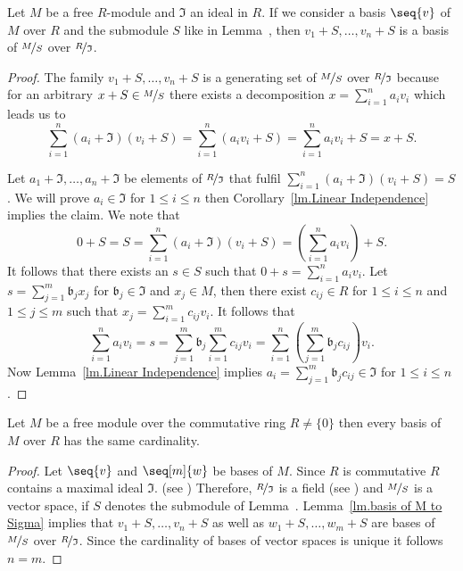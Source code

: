 \begin{lemma}\label{lm.basis of M to Sigma}
Let $M$ be a free $R$-module and $\mathfrak{I}$ an ideal in $R$. If we consider a basis $\seq{v}$ of $M$ over $R$ and the submodule $S$ like in Lemma~, then $v_1+S,\ldots,v_n+S$ is a basis of $\nicefrac{M}{S}$ over $\nicefrac{R}{\mathfrak{I}}$.
\end{lemma}
\begin{proof}
The family $v_1+S,\ldots,v_n+S$ is a generating set of $\nicefrac{M}{S}$ over $\nicefrac{R}{\mathfrak{I}}$ because for an arbitrary $x+S\in\nicefrac{M}{S}$ there exists a decomposition $x=\sum_{i=1}^na_iv_i$ which leads us to 
\begin{equation*}
\sum_{i=1}^n(a_i+\mathfrak{I})(v_i+S)=\sum_{i=1}^n(a_iv_i+S)=\sum_{i=1}^na_iv_i+S=x+S.
\end{equation*}

Let $a_1+\mathfrak{I},\ldots,a_n+\mathfrak{I}$ be elements of $\nicefrac{R}{\mathfrak{I}}$ that fulfil $\sum_{i=1}^n(a_i+\mathfrak{I})(v_i+S)=S$. We will prove $a_i\in\mathfrak{I}$ for $1\leq i\leq n$ then Corollary~\ref{lm.Linear Independence} implies the claim. We note that 
\begin{equation*}
0+S=S=\sum_{i=1}^n(a_i+\mathfrak{I})(v_i+S)=\left(\sum_{i=1}^n a_iv_i\right)+S.
\end{equation*}
It follows that there exists an $s\in S$ such that $0+s=\sum_{i=1}^n a_iv_i$. Let $s=\sum_{j=1}^m\mathfrak{b}_jx_j$ for $\mathfrak{b}_j\in \mathfrak{I}$ and $x_j\in M$, then there exist $c_{ij}\in R$ for $1\leq i\leq n$ and $1\leq j\leq m$ such that $x_j=\sum_{i=1}^mc_{ij}v_i$. It follows that
\begin{equation*}
\sum_{i=1}^n a_iv_i=s=\sum_{j=1}^m\mathfrak{b}_j\sum_{i=1}^mc_{ij}v_i=\sum_{i=1}^n\left(\sum_{j=1}^m\mathfrak{b}_jc_{ij}\right)v_i.
\end{equation*}
Now Lemma~\ref{lm.Linear Independence} implies $a_i=\sum_{j=1}^m\mathfrak{b}_jc_{ij}\in \mathfrak{I}$ for $1\leq i\leq n$.
\end{proof}

\begin{theo}
Let $M$ be a free module over the commutative ring $R\neq\lbrace 0\rbrace$ then every basis of $M$ over $R$ has the same cardinality.
\end{theo}
\begin{proof}
Let $\seq{v}$ and $\seq[m]{w}$ be bases of $M$. Since $R$ is commutative $R$ contains a maximal ideal $\mathfrak{I}$. (see \cite[Thm.III.3.6]{jantzen2005algebra}) Therefore, $\nicefrac{R}{\mathfrak{I}}$ is a field (see \cite[p.93]{lang2002algebra}) and $\nicefrac{M}{S}$ is a vector space, if $S$ denotes the submodule of Lemma~. Lemma~\ref{lm.basis of M to Sigma} implies that $v_1+S,\ldots,v_n+S$ as well as $w_1+S,\ldots,w_m+S$ are bases of $\nicefrac{M}{S}$ over $\nicefrac{R}{\mathfrak{I}}$. Since the cardinality of bases of vector spaces is unique it follows $n=m$.
\end{proof}